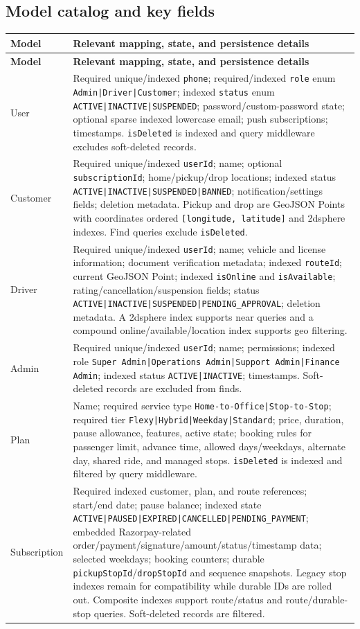 \documentclass[11pt,a4paper]{article}
\newcommand{\code}[1]{\texttt{#1}}
\begin{document}
\subsection{Model catalog and key fields}
\begin{longtable}{p{} p{}}
\toprule
\textbf{Model} & \textbf{Relevant mapping, state, and persistence details} \\
\midrule
\endfirsthead
\toprule
\textbf{Model} & \textbf{Relevant mapping, state, and persistence details} \\
\midrule
\endhead
User & Required unique/indexed \code{phone}; required/indexed \code{role} enum \code{Admin|Driver|Customer}; indexed \code{status} enum \code{ACTIVE|INACTIVE|SUSPENDED}; password/custom-password state; optional sparse indexed lowercase email; push subscriptions; timestamps. \code{isDeleted} is indexed and query middleware excludes soft-deleted records. \\
Customer & Required unique/indexed \code{userId}; name; optional \code{subscriptionId}; home/pickup/drop locations; indexed status \code{ACTIVE|INACTIVE|SUSPENDED|BANNED}; notification/settings fields; deletion metadata. Pickup and drop are GeoJSON Points with coordinates ordered \code{[longitude, latitude]} and 2dsphere indexes. Find queries exclude \code{isDeleted}. \\
Driver & Required unique/indexed \code{userId}; name; vehicle and license information; document verification metadata; indexed \code{routeId}; current GeoJSON Point; indexed \code{isOnline} and \code{isAvailable}; rating/cancellation/suspension fields; status \code{ACTIVE|INACTIVE|SUSPENDED|PENDING\_APPROVAL}; deletion metadata. A 2dsphere index supports near queries and a compound online/available/location index supports geo filtering. \\
Admin & Required unique/indexed \code{userId}; name; permissions; indexed role \code{Super Admin|Operations Admin|Support Admin|Finance Admin}; indexed status \code{ACTIVE|INACTIVE}; timestamps. Soft-deleted records are excluded from finds. \\
Plan & Name; required service type \code{Home-to-Office|Stop-to-Stop}; required tier \code{Flexy|Hybrid|Weekday|Standard}; price, duration, pause allowance, features, active state; booking rules for passenger limit, advance time, allowed days/weekdays, alternate day, shared ride, and managed stops. \code{isDeleted} is indexed and filtered by query middleware. \\
Subscription & Required indexed customer, plan, and route references; start/end date; pause balance; indexed state \code{ACTIVE|PAUSED|EXPIRED|CANCELLED|PENDING\_PAYMENT}; embedded Razorpay-related order/payment/signature/amount/status/timestamp data; selected weekdays; booking counters; durable \code{pickupStopId}/\code{dropStopId} and sequence snapshots. Legacy stop indexes remain for compatibility while durable IDs are rolled out. Composite indexes support route/status and route/durable-stop queries. Soft-deleted records are filtered. \\

\end{longtable}
\end{document}
